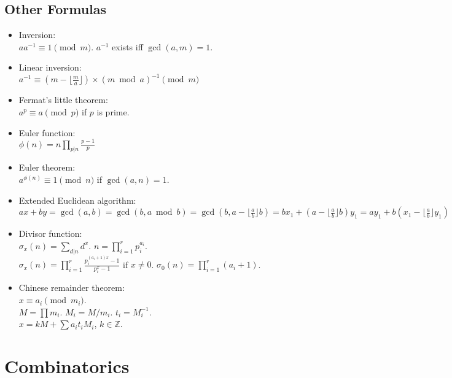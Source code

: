 \documentclass[twocolumn]{article}
\begin{document}
\subsection{Other Formulas}
\begin{itemize}
    \item Inversion:\\ $aa^{-1} \equiv 1 \pmod{m}$. $a^{-1}$ exists iff $\gcd(a,m)=1$.
    
    \item Linear inversion:\\ $a^{-1} \equiv (m - \lfloor\frac{m}{a}\rfloor) \times (m \bmod a)^{-1} \pmod{m}$
    
    \item Fermat's little theorem:\\ $a^p \equiv a \pmod{p}$ if $p$ is prime.
    
    \item Euler function:\\ $\phi(n)=n \prod_{p|n} \frac{p-1}{p}$
    
    \item Euler theorem:\\ $a^{\phi(n)} \equiv 1 \pmod{n}$ if $\gcd(a,n) = 1$.
    
    \item Extended Euclidean algorithm:\\
    $ax+by=\gcd(a,b)=\gcd(b, a \bmod b)=\gcd(b, a-\lfloor\frac{a}{b}\rfloor b)=bx_1+(a-\lfloor\frac{a}{b}\rfloor b)y_1=ay_1+b(x_1-\lfloor\frac{a}{b}\rfloor y_1)$
    
    \item Divisor function:\\ $\sigma_x(n) = \sum_{d|n}d^x$. $n=\prod_{i=1}^r p_i^{a_i}$.\\ $\sigma_x(n)=\prod_{i=1}^r \frac{p_i^{(a_i+1)x}-1}{p_i^x-1}$ if $x \neq 0$. $\sigma_0(n)=\prod_{i=1}^r (a_i+1)$.
    
    \item Chinese remainder theorem:\\ $x \equiv a_i \pmod{m_i}$.\\
        $M=\prod m_i$. $M_i=M/m_i$. $t_i=M_i^{-1}$.\\
        $x = kM + \sum a_i t_i M_i$, $k \in \mathbb{Z}$.
\end{itemize}

\section{Combinatorics}
\end{document}
